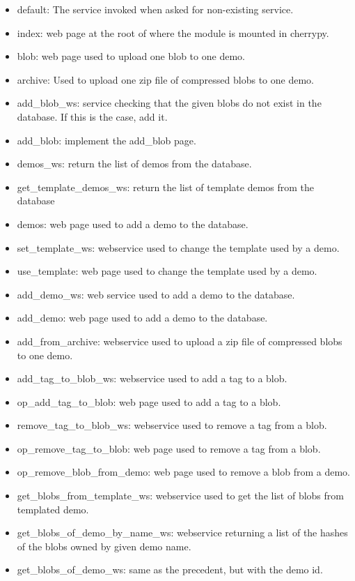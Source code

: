 \begin{itemize}
\item default: The service invoked when asked for non-existing service.
\item index: web page at the root of where the module is mounted in cherrypy.
\item blob: web page used to upload one blob to one demo.
\item archive: Used to upload one zip file of compressed blobs to one demo.
\item add\_blob\_ws: service checking that the given blobs do not exist in the database. If this is the case, add it.
\item add\_blob: implement the add\_blob page.
\item demos\_ws: return the list of demos from the database.
\item get\_template\_demos\_ws: return the list of template demos from the database
\item demos: web page used to add a demo to the database.
\item set\_template\_ws: webservice used to change the template used by a demo.
\item use\_template: web page used to change the template used by a demo.
\item add\_demo\_ws: web service used to add a demo to the database.
\item add\_demo: web page used to add a demo to the database.
\item add\_from\_archive: webservice used to upload a zip file of compressed blobs to one demo.
\item add\_tag\_to\_blob\_ws: webservice used to add a tag to a blob.
\item op\_add\_tag\_to\_blob: web page used to add a tag to a blob.
\item remove\_tag\_to\_blob\_ws: webservice used to remove a tag from a blob.
\item op\_remove\_tag\_to\_blob: web page used to remove a tag from a blob.
\item op\_remove\_blob\_from\_demo: web page used to remove a blob from a demo.
\item get\_blobs\_from\_template\_ws: webservice used to get the list of blobs from templated demo.
\item get\_blobs\_of\_demo\_by\_name\_ws: webservice returning a list of the hashes of the blobs owned by given demo name.
\item get\_blobs\_of\_demo\_ws: same as the precedent, but with the demo id.

\end{itemize}
